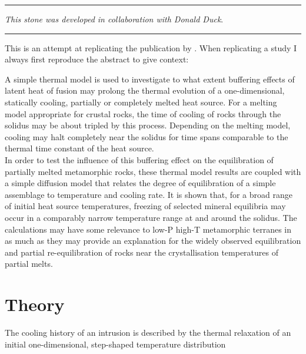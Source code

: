 \par\noindent\rule{\textwidth}{0.4pt}

{\sl This stone was developed in collaboration with Donald Duck}. 

\par\noindent\rule{\textwidth}{0.4pt}


This is an attempt at replicating the publication by . 
When replicating a study I always first reproduce the abstract to give context:
\begin{displayquote}
{\color{darkgray}
A simple thermal model is used to investigate to what extent buffering effects 
of latent heat of fusion may prolong the thermal evolution of a one-dimensional, 
statically cooling, partially or completely melted heat source.
For a melting model appropriate for crustal rocks, the time of cooling of rocks 
through the solidus may be about tripled by this process. Depending on the melting 
model, cooling may halt completely near the solidus for time spans
comparable to the thermal time constant of the heat source.\\
In order to test the influence of this buffering effect on the equilibration of 
partially melted metamorphic rocks, these thermal model results are coupled with 
a simple diffusion model that relates the degree of equilibration of a
simple assemblage to temperature and cooling rate. It is shown that, for a broad 
range of initial heat source temperatures, freezing of selected mineral equilibria 
may occur in a comparably narrow temperature range at and
around the solidus. The calculations may have some relevance to low-P high-T 
metamorphic terranes in as much as they may provide an explanation for the widely 
observed equilibration and partial re-equilibration of rocks near the
crystallisation temperatures of partial melts.}
\end{displayquote}

\section*{Theory}

The cooling history of an intrusion is described by the
thermal relaxation of an initial one-dimensional,
step-shaped temperature distribution

